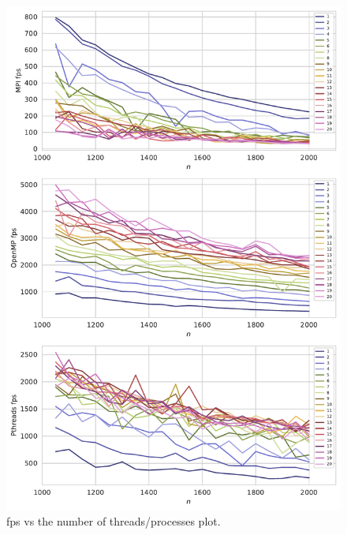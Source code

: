 \documentclass[twoside,12pt]{article}
\theoremstyle{definition}
\theoremstyle{remark}
\begin{document}
\begin{figure}[h!]
    \centering
    \includegraphics[height=0.95\textheight]{../analysis/fps-dim-cpu.pdf}
    \caption{fps vs the number of threads/processes plot.}
    \label{fig:fps-dim-cpu}
\end{figure}
\end{document}
